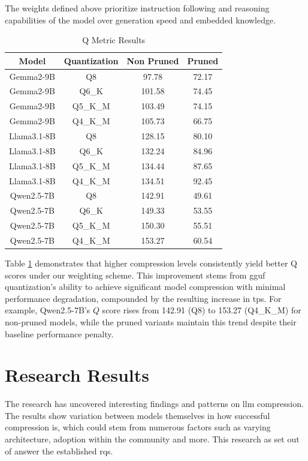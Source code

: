 \documentclass{ifacconf}
\begin{document}
	The weights defined above prioritize instruction following and reasoning capabilities of the model over generation speed and embedded knowledge.
	
	\begin{table}[H]
		\centering
		\caption{Q Metric Results}
		\label{tab:q_results}
		\begin{tabular}{|c|c|c|c|}
			\hline
			\textbf{Model} & \textbf{Quantization} & \textbf{Non Pruned} & \textbf{Pruned} \\
			\hline
			Gemma2-9B & Q8 & 97.78 & 72.17 \\
			\hline
			Gemma2-9B & Q6\_K & 101.58 & 74.45 \\
			\hline
			Gemma2-9B & Q5\_K\_M & 103.49 & 74.15 \\
			\hline
			Gemma2-9B & Q4\_K\_M & 105.73 & 66.75 \\
			\hline
			Llama3.1-8B & Q8 & 128.15 & 80.10 \\
			\hline
			Llama3.1-8B & Q6\_K & 132.24 & 84.96 \\
			\hline
			Llama3.1-8B & Q5\_K\_M & 134.44 & 87.65 \\
			\hline
			Llama3.1-8B & Q4\_K\_M & 134.51 & 92.45 \\
			\hline
			Qwen2.5-7B & Q8 & 142.91 & 49.61 \\
			\hline
			Qwen2.5-7B & Q6\_K & 149.33 & 53.55 \\
			\hline
			Qwen2.5-7B & Q5\_K\_M & 150.30 & 55.51 \\
			\hline
			Qwen2.5-7B & Q4\_K\_M & 153.27 & 60.54 \\
			\hline
		\end{tabular}
	\end{table}
	
	Table \ref{tab:q_results} demonstrates that higher compression levels consistently yield better  Q scores under our weighting scheme. This improvement stems from \gls{gguf} quantization's ability to achieve significant model compression with minimal performance degradation, compounded by the resulting increase in \gls{tps}. For example, Qwen2.5-7B's  $Q$ score rises from 142.91 (Q8) to 153.27 (Q4\_K\_M) for non-pruned models, while the pruned variants maintain this trend despite their baseline performance penalty.
	
	\section{Research Results}
	The research has uncovered interesting findings and patterns on \gls{llm} compression. The results show variation between models themselves in how successful compression is, which could stem from numerous factors such as varying architecture, adoption within the community and more. This research as set out of answer the established \glspl{rq}. 
	
\end{document}
